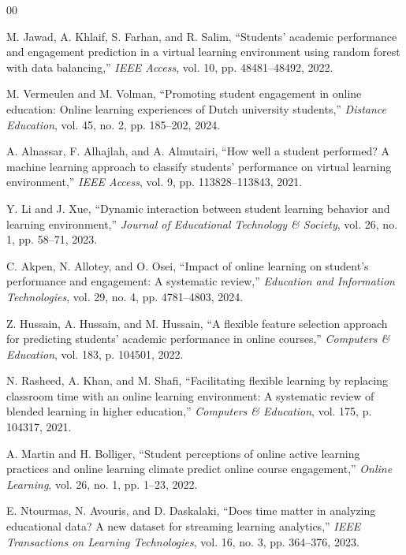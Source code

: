 \documentclass[conference]{IEEEtran}
\begin{document}
\begin{thebibliography}{00}

 M. Jawad, A. Khlaif, S. Farhan, and R. Salim, ``Students' academic performance and engagement prediction in a virtual learning environment using random forest with data balancing,'' \textit{IEEE Access}, vol. 10, pp. 48481--48492, 2022.

 M. Vermeulen and M. Volman, ``Promoting student engagement in online education: Online learning experiences of Dutch university students,'' \textit{Distance Education}, vol. 45, no. 2, pp. 185--202, 2024.

 A. Alnassar, F. Alhajlah, and A. Almutairi, ``How well a student performed? A machine learning approach to classify students' performance on virtual learning environment,'' \textit{IEEE Access}, vol. 9, pp. 113828--113843, 2021.

 Y. Li and J. Xue, ``Dynamic interaction between student learning behavior and learning environment,'' \textit{Journal of Educational Technology \& Society}, vol. 26, no. 1, pp. 58--71, 2023.

 C. Akpen, N. Allotey, and O. Osei, ``Impact of online learning on student's performance and engagement: A systematic review,'' \textit{Education and Information Technologies}, vol. 29, no. 4, pp. 4781--4803, 2024.

 Z. Hussain, A. Hussain, and M. Hussain, ``A flexible feature selection approach for predicting students' academic performance in online courses,'' \textit{Computers \& Education}, vol. 183, p. 104501, 2022.

 N. Rasheed, A. Khan, and M. Shafi, ``Facilitating flexible learning by replacing classroom time with an online learning environment: A systematic review of blended learning in higher education,'' \textit{Computers \& Education}, vol. 175, p. 104317, 2021.

 A. Martin and H. Bolliger, ``Student perceptions of online active learning practices and online learning climate predict online course engagement,'' \textit{Online Learning}, vol. 26, no. 1, pp. 1--23, 2022.

 E. Ntourmas, N. Avouris, and D. Daskalaki, ``Does time matter in analyzing educational data? A new dataset for streaming learning analytics,'' \textit{IEEE Transactions on Learning Technologies}, vol. 16, no. 3, pp. 364--376, 2023.


\end{thebibliography}
\end{document}
